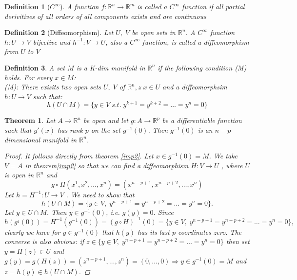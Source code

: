 \documentclass[12pt]{article}
\def\RR{\mathbb{R}}
\newtheorem{theorem}{Theorem}[section]
\newtheorem{definition}{Definition}[section]
\begin{document}
\begin{definition}[$C^{\infty}$]
A function $f:\RR^n \rightarrow \RR^m$ is called a $C^{\infty}$ function if all partial derivitives of all orders of all components exists and are continuous
\end{definition}

\begin{definition}[Diffeomorphism]
Let $U, \; V$ be open sets in $\RR^n$. A $C^{\infty}$ function $h:U\rightarrow V$ bijective and $h^{-1}:V \rightarrow U$, also a $C^{\infty}$ function, is called a diffeomorphism from $U$ to $V$
\end{definition}

\begin{definition}
A set $M$ is a K-dim manifold in $\RR^n$ if the following condition (M) holds. For every $x \in M$:\\
(M): There exisits two open sets $U, \; V$ of $\RR^n, z\; x \in U$ and a diffeomorphsim $h:U \rightarrow V$ such that:
\[ h(U \cap M) = \{ y \in V \; s.t. \;y^{k+1} = y^{k+2} = \dots = y^{n} = 0\} \]
\end{definition}  

\begin{theorem}
 Let $A \rightarrow \RR^n$ be open and let $g : A \rightarrow \RR^p$ be a differentiable function such
that $g'(x)$ has rank $p$ on the set $g^{-1}(0)$. Then $g^{-1}(0)$ is an $n\! -\! p$ dimensional manifold in $\RR^n$.
\begin{proof}
 It follows directly from theorem \ref{imp2}. Let $x \in g^{-1}(0) = M$. We take $V = A$ in theorem\ref{imp2} so that we can find a diffeomorphism $H : V \rightarrow U$ , where $U$ is open in $\RR^n$ and 
\[g \circ H(x^1, x^2, \dots, x^n) = (x^{n-p+1}, x^{n-p+2}, \dots , x^n) \]
Let $h = H^{-1} : U \rightarrow V$ . We need to show that 
\[h(U \cap M) = \{y \in V,\; y^{n-p+1} = y^{n-p+2} = \dots = y^n = 0\}.\]
Let $y \in U \cap M$. Then $y \in g^{-1}(0)$, i.e. $g(y) = 0$. Since
\[h(g^{_1}(0)) = H^{-1}(g^{-1}(0)) = (g \circ H)^{-1}(0) = \{y \in V,\; y^{n-p+1} = y^{n-p+2} = \dots = y^n = 0\},\]
clearly we have for $ y \in g^{-1}(0)$ that $ h(y)$ has its last $p$ coordinates zero. The converse is
also obvious: if $z \in \{y \in V,\; y^{n-p+1} = y^{n-p+2} = \dots = y^n = 0\}$ then set $y = H(z) \in U$
and $g(y) = g(H(z)) = (z^{n-p+1},\dots, z^n) = (0,\dots ,0) \Rightarrow y \in g^{-1}(0) = M$ and $z = h(y) \in
h(U \cap M).$
\end{proof}
\end{theorem}
\end{document}
